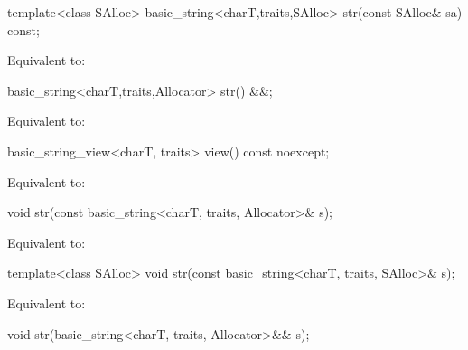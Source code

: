 %
\begin{itemdecl}
template<class SAlloc>
  basic_string<charT,traits,SAlloc> str(const SAlloc& sa) const;
\end{itemdecl}

\begin{itemdescr}
\pnum
\effects
Equivalent to: 
\end{itemdescr}

%
\begin{itemdecl}
basic_string<charT,traits,Allocator> str() &&;
\end{itemdecl}

\begin{itemdescr}
\pnum
\effects
Equivalent to: 
\end{itemdescr}

%
\begin{itemdecl}
basic_string_view<charT, traits> view() const noexcept;
\end{itemdecl}

\begin{itemdescr}
\pnum
\effects
Equivalent to: 
\end{itemdescr}

%
\begin{itemdecl}
void str(const basic_string<charT, traits, Allocator>& s);
\end{itemdecl}

\begin{itemdescr}
\pnum
\effects
Equivalent to: 
\end{itemdescr}

%
\begin{itemdecl}
template<class SAlloc>
  void str(const basic_string<charT, traits, SAlloc>& s);
\end{itemdecl}

\begin{itemdescr}
\pnum
\effects
Equivalent to: 
\end{itemdescr}

%
\begin{itemdecl}
void str(basic_string<charT, traits, Allocator>&& s);
\end{itemdecl}

